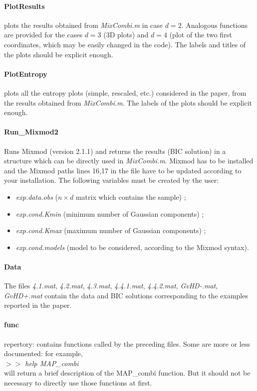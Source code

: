 \documentclass[12pt]{article}
\begin{document}
\paragraph{PlotResults}plots the results obtained from {\it MixCombi.m} in case $d=2$. Analogous functions are provided for the cases $d=3$ (3D plots) and $d=4$ (plot of the two first coordinates, which may be easily changed in the code). The labels and titles of the plots should be explicit enough.

\paragraph{PlotEntropy}plots all the entropy plots (simple, rescaled, etc.) considered in the paper, from the results obtained from {\it MixCombi.m}. The labels of the plots should be explicit enough.

\paragraph{Run\_Mixmod2} Runs Mixmod (version 2.1.1) and returns the results (BIC solution) in a structure which can be directly used in {\it MixCombi.m}. Mixmod has to be installed and the Mixmod paths lines 16,17 in the file have to be updated according to your installation. The following variables must be created by the user:
\begin{itemize}
\item {\it exp.data.obs} ($n\times d$ matrix which contains the sample) ;
\item {\it exp.cond.Kmin} (minimum number of Gaussian components) ;
\item {\it exp.cond.Kmax} (maximum number of Gaussian components) ;
\item {\it exp.cond.models} (model to be considered, according to the Mixmod syntax).
\end{itemize}

\paragraph{Data} The files {\it 4.1.mat}, {\it 4.2.mat}, {\it 4.3.mat}, {\it 4.4.1.mat}, {\it 4.4.2.mat}, {\it GvHD-.mat}, {\it GvHD+.mat} contain the data and BIC solutions corresponding to the examples reported in the paper.

\paragraph{func} repertory: contains functions called by the preceding files. Some are more or less documented: for example, \\
{\it $>>$ help MAP\_combi}\\
will return a brief description of the MAP\_combi function. But it should not be necessary to directly use those functions at first.
\end{document}
